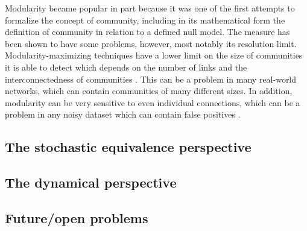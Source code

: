 Modularity became popular in part because it was one of the first
attempts to formalize the concept of community, including in its
mathematical form the definition of community in relation to a defined
null model. The measure has been shown to have some problems, however,
most notably its resolution limit. Modularity-maximizing techniques have
a lower limit on the size of communities it is able to detect which
depends on the number of links and the interconnectedness of communities
\autocite{fortunato_resolution_2007}. This can be a problem in many
real-world networks, which can contain communities of many different
sizes. In addition, modularity can be very sensitive to even individual
connections, which can be a problem in any noisy dataset which can
contain false positives \autocite{fortunato_community_2010}.

\hypertarget{the-stochastic-equivalence-perspective}{\subsection{The
stochastic equivalence
perspective}\label{the-stochastic-equivalence-perspective}}

\hypertarget{the-dynamical-perspective}{\subsection{The dynamical
perspective}\label{the-dynamical-perspective}}

\subsection{Future/open problems}\label{futureopen-problems}

